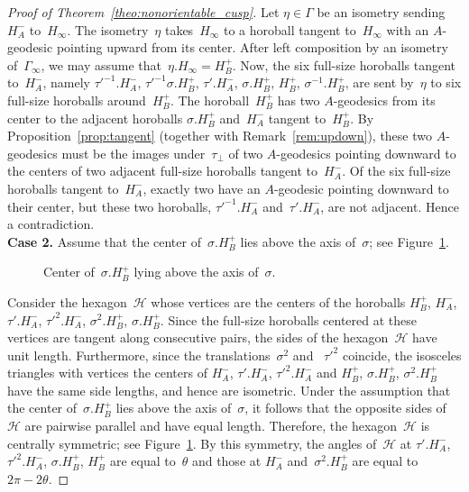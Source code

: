 \documentclass[11pt,reqno]{amsart}
\theoremstyle{definition}
\numberwithin{equation}{section}
\numberwithin{equation}{section}
\begin{document}
\begin{proof}[Proof of Theorem~\ref{theo:nonorientable_cusp}]
Let $\eta \in \Gamma$ be an isometry sending~$H_A^-$ to~$H_\infty$.
The isometry~$\eta$ takes~$H_\infty$ to a horoball tangent to~$H_\infty$ with an $A$-geodesic pointing upward from its center.
After left composition by an isometry of~$\Gamma_\infty$, we may assume that~$\eta.H_\infty=H_B^+$.
Now, the six full-size horoballs tangent to~$H_A^-$, namely $\tau'^{-1}.H_A^-$, $\tau'^{-1} \sigma.H_B^+$, $\tau'.H_A^-$, $\sigma.H_B^+$, $H_B^+$, $\sigma^{-1}.H_B^+$, are sent by~$\eta$ to six full-size horoballs around~$H_B^+$.
The horoball~$H_B^+$ has two $A$-geodesics from its center to the adjacent horoballs $\sigma.H_B^+$ and~$H_A^-$ tangent to~$H_B^+$.
By Proposition~\ref{prop:tangent} (together with Remark~\ref{rem:updown}), these two $A$-geodesics must be the images under~$\tau_\perp$ of two $A$-geodesics pointing downward to the centers of two adjacent full-size horoballs tangent to~$H_A^-$.
Of the six full-size horoballs tangent to~$H_A^-$, exactly two have an $A$-geodesic pointing downward to their center, but these two horoballs, $\tau'^{-1}.H_A^-$ and~$\tau'.H_A^-$, are not adjacent.
Hence a contradiction.  \\

\noindent \textbf{Case 2.}
Assume that the center of~$\sigma.H_B^+$ lies above the axis of~$\sigma$; see Figure~\ref{fig:666}.



\medskip

\begin{figure}[htbp!]
\centering
\vspace*{3,2cm}
\hspace*{-0.5cm}
\def\svgwidth{0.3\textheight}

\vspace*{0.4cm}
\caption{Center of~$\sigma.H_B^+$ lying above the axis of~$\sigma$.} \label{fig:666}
\end{figure}


Consider the hexagon~$\mathcal{H}$ whose vertices are the centers of the horoballs $H_B^+$, $H_A^-$, $\tau'.H_A^-$, $\tau'^2.H_A^-$, $\sigma^2.H_B^+$, $\sigma.H_B^+$.
Since the full-size horoballs centered at these vertices are tangent along consecutive pairs, the sides of the hexagon~$\mathcal{H}$ have unit length.
Furthermore, since the translations~$\sigma^2$ and ~$\tau'^2$ coincide, the isosceles triangles with vertices the centers of $H_A^-$, $\tau'.H_A^-$, $\tau'^2.H_A^-$ and $H_B^+$, $\sigma.H_B^+$, $\sigma^2.H_B^+$ have the same side lengths, and hence are isometric.
Under the assumption that the center of~$\sigma.H_B^+$ lies above the axis of~$\sigma$, it follows that the opposite sides of~$\mathcal{H}$ are pairwise parallel and have equal length.
Therefore, the hexagon~$\mathcal{H}$ is centrally symmetric; see Figure~\ref{fig:666}.
By this symmetry, the angles of~$\mathcal{H}$ at $\tau'.H_A^-$, $\tau'^2.H_A^-$, $\sigma.H_B^+$, $H_B^+$ are equal to~$\theta$ and those at $H_A^-$ and~$\sigma^2.H_B^+$ are equal to~$2\pi-2\theta$.


\end{proof}
\end{document}
